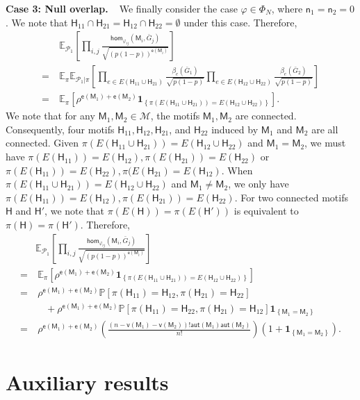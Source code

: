 \documentclass[letterpaper,11pt]{article}
\theoremstyle{definition}
\newcommand{\maM}{\mathcal{M}}
\newcommand{\maP}{\mathcal{P}}
\newcommand{\prob}[1]{ \mathbb{P}\left[ #1 \right] }
\newcommand{\en}{\mathsf{{e}}}
\newcommand{\vn}{\mathsf{{v}}}
\newcommand{\pth}[1]{\left( #1 \right)}
\newcommand{\qth}[1]{\left[ #1 \right]}
\newcommand{\sfH}{{\mathsf{H}}}
\newcommand{\sfM}{{\mathsf{M}}}
\newcommand{\sfn}{{\mathsf{n}}}
\newcommand{\indc}[1]{{\mathbf{1}_{\left\{{#1}\right\}}}}
\newcommand{\aut}{\mathsf{aut}}
\renewcommand{\hom}{\mathsf{hom}}
\newcommand{\vp}{\varphi}
\def\E{\mathbb{E}}
\begin{document}
\textbf{Case 3: Null overlap.\ \ }We finally consider the case $\vp\in \Phi_N$, where $\sfn_1=\sfn_2 =0$. 
We note that $\sfH_{11}\cap \sfH_{21}=\sfH_{12}\cap \sfH_{22}= \emptyset$ under this case. Therefore,\begin{align*}
        &~\E_{\maP_1}\qth{\prod_{i,j}\frac{\hom_{\vp_{ij}}(\sfM_i,\bar{G}_j)}{\sqrt{(p(1-p))^{\en(\sfM_i)}}}}\\ =&~ \E_\pi \E_{\maP_1|\pi}\qth{  \prod_{e\in E(\sfH_{11}\cup \sfH_{21})} \frac{\beta_e(\bar{G}_1)}{\sqrt{p(1-p)}} \prod_{e\in E(\sfH_{12}\cup \sfH_{22}) }\frac{\beta_e(\bar{G}_2)}{\sqrt{p(1-p)}}}\\=&~\E_\pi \qth{\rho^{\en(\sfM_1)+\en(\sfM_2)}\indc{\pi(E(\sfH_{11}\cup \sfH_{21})) = E(\sfH_{12}\cup \sfH_{22})}}.
    \end{align*}
We note that for any $\sfM_1,\sfM_2\in \maM$, the motifs $\sfM_1,\sfM_2$ are connected. Consequently, four motifs $\sfH_{11},\sfH_{12},\sfH_{21}$, and $\sfH_{22}$ induced by $\sfM_1$ and $\sfM_2$ are all connected. 
Given $\pi(E(\sfH_{11}\cup \sfH_{21})) = E(\sfH_{12}\cup \sfH_{22})$ and $\sfM_1 = \sfM_2$, we must have $\pi(E(\sfH_{11})) = E(\sfH_{12}),\pi(E(\sfH_{21}))=E(\sfH_{22})$ or $\pi(E(\sfH_{11})) = E(\sfH_{22}),\pi(E(\sfH_{21})=E(\sfH_{12})$. When $\pi(E(\sfH_{11}\cup \sfH_{21})) = E(\sfH_{12}\cup \sfH_{22})$ and $\sfM_1 \neq \sfM_2$, we only have $\pi(E(\sfH_{11})) = E(\sfH_{12}),\pi(E(\sfH_{21}))=E(\sfH_{22})$.
For two connected motifs $\sfH$ and $\sfH'$, we note that $\pi(E(\sfH)) = \pi(E(\sfH'))$ is equivalent to $\pi(\sfH) = \pi(\sfH')$.
Therefore,\begin{align*}
    &\E_{\maP_1}\qth{\prod_{i,j}\frac{\hom_{\vp_{ij}}(\sfM_i,\bar{G}_j)}{\sqrt{(p(1-p))^{\en(\sfM_i)}}}}\\
    =&~\E_\pi \qth{\rho^{\en(\sfM_1)+\en(\sfM_2)}\indc{\pi(E(\sfH_{11}\cup \sfH_{21})) = E(\sfH_{12}\cup \sfH_{22})}}\\
    =&~\rho^{\en(\sfM_1)+\en(\sfM_2)}\prob{\pi(\sfH_{11}) = \sfH_{12},\pi(\sfH_{21})=\sfH_{22}}\\&\quad+\rho^{\en(\sfM_1)+\en(\sfM_2)}\prob{\pi(\sfH_{11}) = \sfH_{22},\pi(\sfH_{21})=\sfH_{12}}\indc{\sfM_1 = \sfM_2}\\
    =&~\rho^{\en(\sfM_1)+\en(\sfM_2)}\pth{\frac{(n-\vn(\sfM_1)-\vn(\sfM_2))! \aut(\sfM_1)\aut(\sfM_2)}{n!}}(1+\indc{\sfM_1=\sfM_2}).
\end{align*}

\section{Auxiliary results}
\end{document}
